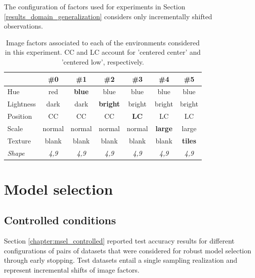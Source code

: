 \begin{dataset}
    The configuration of factors used for experiments in Section \ref{results_domain_generalization}
    considers only incrementally shifted observations.

    \begin{table}[H]
        \centering
        \begin{tabular}{l|c|c|c|c|c|c}
          & \#0 & \#1 & \#2 & \#3 & \#4 & \#5 \\
        \midrule
        Hue & red & \textbf{blue} & blue & blue & blue & blue \\
        Lightness & dark & dark & \textbf{bright} & bright & bright & bright \\
        Position  & CC & CC & CC & \textbf{LC} & LC & LC \\
        Scale  & normal & normal & normal & normal & \textbf{large} & large \\
        Texture & blank & blank & blank & blank & blank & \textbf{tiles} \\
        \textit{Shape} & \textit{4,9} &  \textit{4,9} &  \textit{4,9} & \textit{4,9} & \textit{4,9} & \textit{4,9} \\
        \bottomrule
        \end{tabular}
        \caption{
        Image factors associated to each of the environments considered in this experiment. CC and LC account
        for 'centered center' and 'centered low', respectively.
        }
    \end{table}
\end{dataset}

\section{Model selection}

\subsection{Controlled conditions}

Section \ref{chapter:msel_controlled} reported test accuracy results for different configurations of 
pairs of datasets that were considered for robust model selection through early stopping. Test datasets entail
a single sampling realization and represent incremental shifts of image factors.

